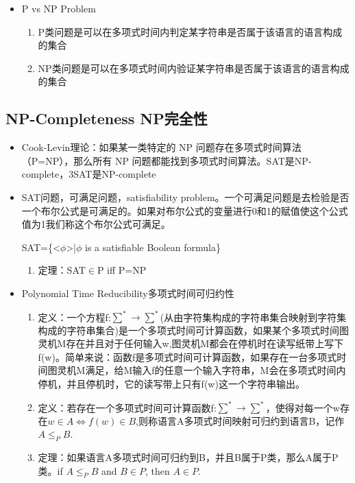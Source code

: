 \documentclass[UTF8]{ctexart}
\begin{document}
\begin{itemize}
    \item P vs NP Problem
    
    \begin{enumerate}
        \item P类问题是可以在多项式时间内判定某字符串是否属于该语言的语言构成的集合
        \item NP类问题是可以在多项式时间内验证某字符串是否属于该语言的语言构成的集合
    \end{enumerate}

\end{itemize}

\subsection{NP-Completeness NP完全性}
\begin{itemize}
    \item Cook-Levin理论：如果某一类特定的 NP 问题存在多项式时间算法（P=NP），那么所有 NP 问题都能找到多项式时间算法。SAT是NP-complete，3SAT是NP-complete
    \item SAT问题，可满足问题，satisfiability problem。一个可满足问题是去检验是否一个布尔公式是可满足的。如果对布尔公式的变量进行0和1的赋值使这个公式值为1我们称这个布尔公式可满足。
    
    SAT=\{<$\phi$>|$\phi$ is a satisfiable Boolean formula\}

    \begin{enumerate}
        \item 定理：SAT$\in$P iff P=NP
    \end{enumerate}
    
    \item Polynomial Time Reducibility多项式时间可归约性
    \begin{enumerate}
        \item 定义：一个方程f:$\sum^* \to \sum^*$(从由字符集构成的字符串集合映射到字符集构成的字符串集合)是一个多项式时间可计算函数，如果某个多项式时间图灵机M存在并且对于任何输入w,图灵机M都会在停机时在读写纸带上写下f(w)。简单来说：函数f是多项式时间可计算函数，如果存在一台多项式时间图灵机M满足，给M输入f的任意一个输入字符串，M会在多项式时间内停机，并且停机时，它的读写带上只有f(w)这一个字符串输出。
        \item 定义：若存在一个多项式时间可计算函数f:$\sum^* \to \sum^*$，使得对每一个w存在$w \in A \Longleftrightarrow f(w)\in B$,则称语言A多项式时间映射可归约到语言B，记作$A \leqslant_P B$.
        \item 定理：如果语言A多项式时间可归约到B，并且B属于P类，那么A属于P类。if $A \leqslant_P B$ and $B \in P$, then $A \in P$.
        

\end{enumerate}
\end{itemize}
\end{document}
